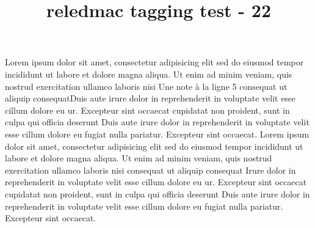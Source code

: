 \documentclass[twoside]{article}
\title{reledmac tagging test - 22}
\begin{document}
\beginnumbering
{}
Lorem ipsum dolor sit amet, consectetur adipisicing elit
sed do eiusmod tempor incididunt ut labore et dolore
magna aliqua. Ut enim ad minim veniam, quis nostrud
exercitation ullamco laboris nisi
Une note à la ligne 5 consequat ut aliquip consequat\pend[\vskip 2ex]
Duis aute irure dolor in reprehenderit
in voluptate velit esse cillum dolore eu ur. Excepteur sint occaecat
cupidatat non proident, sunt in culpa qui officia deserunt
Duis aute irure dolor in reprehenderit
in voluptate velit esse cillum dolore eu fugiat nulla
pariatur. Excepteur sint occaecat.
\pend[]
Lorem ipsum dolor sit amet, consectetur adipisicing elit
sed do eiusmod tempor incididunt ut labore et dolore
magna aliqua. Ut enim ad minim veniam, quis nostrud
exercitation ullamco laboris nisi
 consequat ut aliquip consequat
\pend[\vskip\baselineskip\noindent\hfill*\hfill\hbox{}]
Irure dolor in reprehenderit
in voluptate velit esse cillum dolore eu ur. Excepteur sint occaecat
cupidatat non proident, sunt in culpa qui officia deserunt
Duis aute irure dolor in reprehenderit
in voluptate velit esse cillum dolore eu fugiat nulla
pariatur. Excepteur sint occaecat.
\pend
\endnumbering
\end{document}
